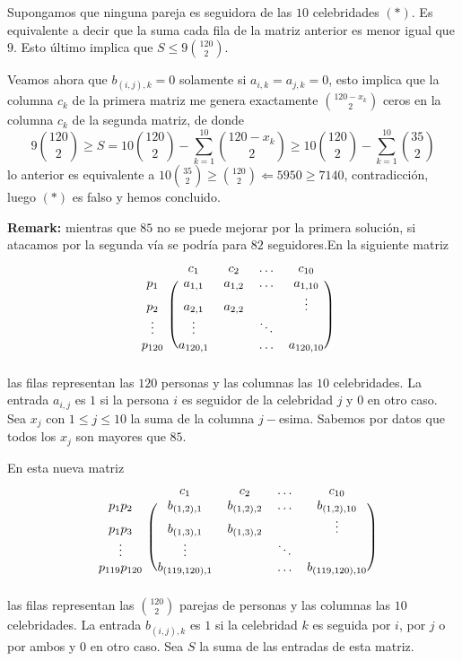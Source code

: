 Supongamos que ninguna pareja es seguidora de las $10$ celebridades $(*)$. Es equivalente a decir que la suma cada fila de la matriz anterior es menor igual que $9$. Esto último implica que $S\le 9{120\choose{2}}$.

Veamos ahora que $b_{(i,j), k}=0$ solamente si $a_{i,k} = a_{j,k} = 0$, esto implica que la columna $c_k$ de la primera matriz me genera exactamente ${120-x_k\choose{2}}$ ceros en la columna $c_k$ de la segunda matriz, de donde
\[
9{120\choose{2}}\ge S = 10{120\choose{2}}- \sum_{k=1}^{10}{120-x_k\choose{2}}\ge  10{120\choose{2}}- \sum_{k=1}^{10}{35\choose{2}}
\]
lo anterior es equivalente a $10{35\choose{2}} \ge {120\choose{2}} \Longleftarrow 5950\ge 7140$, contradicción, luego $(*)$ es falso y hemos concluido.

\textbf{Remark:} mientras que $85$ no se puede mejorar por la primera solución, si atacamos por la segunda vía se podría para $82$ seguidores.En la siguiente matriz
\[
\begin{blockarray}{ccccc}
& c_1 & c_2 & \dots & c_{10} \\
\begin{block}{c(cccc)}
  p_1 & a_{1,1} & a_{1,2} & \dots & a_{1,10}  \\
  p_2 & a_{2,1} & a_{2,2} &  & \vdots \\
  \vdots & \vdots &  & \ddots  &  \\   
  p_{120} & a_{120,1} &  & \dots & a_{120,10} \\
\end{block}
\end{blockarray}
 \]
 las filas representan las $120$ personas y las columnas las $10$ celebridades. La entrada $a_{i,j}$ es $1$ si la persona $i$ es seguidor de la celebridad $j$ y $0$ en otro caso. Sea $x_j$ con $1\le j\le 10$ la suma de la columna $j-$esima. Sabemos por datos que todos los $x_j$ son mayores que $85.$ 

En esta nueva matriz 
\[
\begin{blockarray}{ccccc}
& c_1 & c_2 & \dots & c_{10} \\
\begin{block}{c(cccc)}
  p_1p_2 & b_{(1,2),1} & b_{(1,2),2} & \dots & b_{(1,2),10}  \\
  p_1p_3 & b_{(1,3),1} & b_{(1,3),2} &  & \vdots \\
  \vdots & \vdots &  & \ddots  &  \\   
  p_{119}p_{120} & b_{(119,120),1} &  & \dots & b_{(119,120),10} \\
\end{block}
\end{blockarray}
 \]
las filas representan las ${120\choose{2}}$ parejas de personas y las columnas las $10$ celebridades. La entrada $b_{(i,j), k}$ es $1$ si la celebridad $k$ es seguida por $i$, por $j$ o por ambos y $0$ en otro caso. Sea $S$ la suma de las entradas de esta matriz.\\

